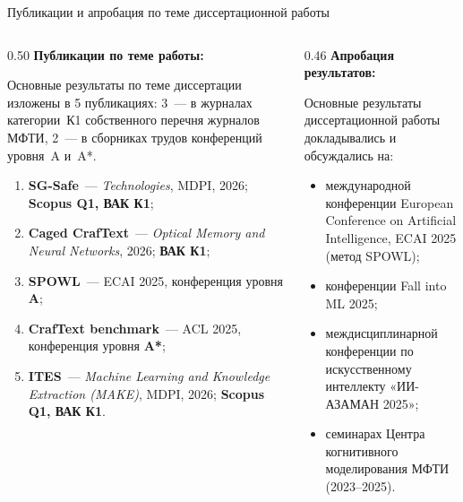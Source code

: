 \begin{frame}[shrink=5]{Публикации и апробация по теме диссертационной работы}
    \footnotesize
    \begin{columns}[T,onlytextwidth]
        \begin{column}{0.50\textwidth}
            \textbf{Публикации по теме работы:}

            \vspace{0.2em}
            Основные результаты по теме диссертации изложены в 5 публикациях:
            3~--- в журналах категории~К1 собственного перечня журналов МФТИ,
            2~--- в сборниках трудов конференций уровня~A и~A*.

            \vspace{0.25em}
            \begin{enumerate}
                \item \textbf{SG-Safe}~--- \textit{Technologies}, MDPI, 2026;
                      \textbf{Scopus Q1, ВАК К1};
                \item \textbf{Caged CrafText}~--- \textit{Optical Memory and
                      Neural Networks}, 2026; \textbf{ВАК К1};
                \item \textbf{SPOWL}~--- ECAI 2025, конференция уровня
                      \textbf{A};
                \item \textbf{CrafText benchmark}~--- ACL 2025, конференция
                      уровня \textbf{A*};
                \item \textbf{ITES}~--- \textit{Machine Learning and Knowledge
                      Extraction (MAKE)}, MDPI, 2026; \textbf{Scopus Q1, ВАК К1}.
            \end{enumerate}
        \end{column}
        \begin{column}{0.46\textwidth}
            \textbf{Апробация результатов:}

            \vspace{0.2em}
            Основные результаты диссертационной работы докладывались
            и обсуждались на:

            \vspace{0.25em}
            \begin{itemize}
                \item международной конференции European Conference on
                      Artificial Intelligence, ECAI 2025 (метод SPOWL);
                \item конференции Fall into ML 2025;
                \item междисциплинарной конференции по искусственному
                      интеллекту «ИИ-АЗАМАН 2025»;
                \item семинарах Центра когнитивного моделирования МФТИ
                      (2023--2025).
            \end{itemize}
        \end{column}
    \end{columns}
\end{frame}
